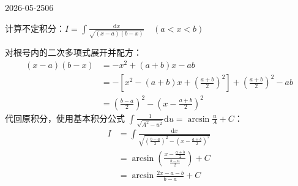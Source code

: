 \begin{mistake}{2026-05-25}{06}

\begin{problemcontent}
计算不定积分：\(I = \int \frac{\mathrm{d}x}{\sqrt{(x-a)(b-x)}} \quad (a < x < b)\)
\end{problemcontent}

\begin{solutioncontent}
对根号内的二次多项式展开并配方：
\[
\begin{aligned}
(x-a)(b-x) &= -x^2 + (a+b)x - ab \\
&= -\left[ x^2 - (a+b)x + \left(\frac{a+b}{2}\right)^2 \right] + \left(\frac{a+b}{2}\right)^2 - ab \\
&= \left(\frac{b-a}{2}\right)^2 - \left(x - \frac{a+b}{2}\right)^2
\end{aligned}
\]
代回原积分，使用基本积分公式 \(\int \frac{1}{\sqrt{A^2-u^2}} \mathrm{d}u = \arcsin\frac{u}{A} + C\)：
\[
\begin{aligned}
I &= \int \frac{\mathrm{d}x}{\sqrt{\left(\frac{b-a}{2}\right)^2 - \left(x - \frac{a+b}{2}\right)^2}} \\
&= \arcsin \left( \frac{x - \frac{a+b}{2}}{\frac{b-a}{2}} \right) + C \\
&= \arcsin\frac{2x - a - b}{b-a} + C
\end{aligned}
\]
\end{solutioncontent}


\end{mistake}
